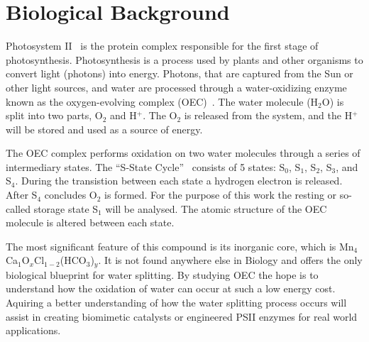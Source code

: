 \section{Biological Background}

Photosystem II~\cite{oxygenicPhotosynthesis} is the protein complex responsible for the first stage of photosynthesis. Photosynthesis is a process used by plants and other organisms to convert light (photons) into energy. Photons, that are captured from the Sun or other light sources, and water are processed through a water-oxidizing enzyme known as the oxygen-evolving complex (OEC)~\cite{yano2006manganese}. The water molecule (H$_{2}$O) is split into two parts, O$_{2}$ and H$^{+}$. The O$_{2}$ is released from the system, and the H$^{+}$ will be stored and used as a source of energy.

The OEC complex performs oxidation on two water molecules through a series of intermediary states. The ``S-State Cycle''~\cite{yano2006manganese} consists of 5 states: S$_{0}$, S$_{1}$, S$_{2}$, S$_{3}$, and S$_{4}$. During the transistion between each state a hydrogen electron is released. After S$_{4}$ concludes O$_{2}$ is formed. For the purpose of this work the resting or so-called storage state S$_{1}$ will be analysed. The atomic structure of the OEC molecule is altered between each state.

The most significant feature of this compound is its inorganic core, which is Mn$_{4}$Ca$_{1}$O$_{x}$Cl$_{1-2}$(HCO$_{3}$)$_{y}$. It is not found anywhere else in Biology and offers the only biological blueprint for water splitting. By studying OEC the hope is to understand how the oxidation of water can occur at such a low energy cost. Aquiring a better understanding of how the water splitting process occurs will assist in creating biomimetic catalysts or engineered PSII enzymes for real world applications.